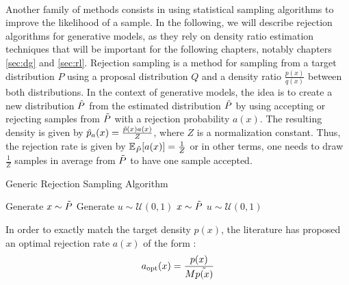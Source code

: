 \\
Another family of methods consists in using statistical sampling algorithms to improve the likelihood of a sample. In the following, we will describe rejection algorithms for generative models, as they rely on density ratio estimation techniques that will be important for the following chapters, notably chapters \ref{sec:dg} and \ref{sec:rl}. 
Rejection sampling \citep{vonN51} is a method for sampling from a target distribution $P$ using a proposal distribution $Q$ and a density ratio $\frac{p(x)}{q(x)}$ between both distributions. In the context of generative models, the idea is to create a new distribution $\Hat{P}$ from the estimated distribution $\Tilde{P}$ by using accepting or rejecting samples from $\Tilde{P}$ with a rejection probability $a(x)$. The resulting density is given by $\hat{p}_{a}(x) = \frac{\Tilde{p}(x)a(x)}{Z}$, where $Z$ is a normalization constant. Thus, the rejection rate is given by $\mathbb{E}_{\Tilde{P}}[a(x)] = \frac{1}{Z}$ or in other terms, one needs to draw $\frac{1}{Z}$ samples in average from $\Tilde{P}$ to have one sample accepted.
\begin{algorithm}
\caption{Generic Rejection Sampling Algorithm}
\begin{algorithmic}[1] %
\State Generate $x \sim \Tilde{P}$
\State Generate $u \sim \mathcal{U}(0,1)$
 
    \State $x \sim \Tilde{P}$
    \State $u \sim \mathcal{U}(0, 1)$ 
\EndWhile
\end{algorithmic}
\end{algorithm}
In order to exactly match the target density $p(x)$, the literature has proposed an optimal rejection rate $a(x)$ of the form : 
\begin{equation}\label{eq:optimal_rejection}
    a_{\mathrm{opt}}(x) = \frac{p(x)}{M\Tilde{p(x)}}
\end{equation}
